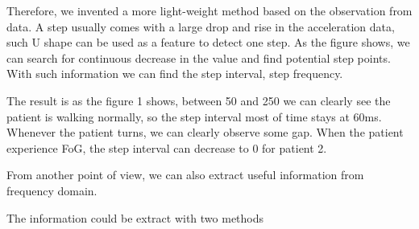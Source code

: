 \documentclass[article]{article}
\begin{document}
\begin{enumerate}
		Therefore, we invented a more light-weight method based on the observation from data. A step usually comes with a large drop and rise in the acceleration data, such U shape can be used as a feature to detect one step. As the figure shows, we can search for continuous decrease in the value and find potential step points. With such information we can find the step interval, step frequency.
		
		The result is as the figure 1 shows, between 50 and 250 we can clearly see the patient is walking normally, so the step interval most of time stays at 60ms. Whenever the patient turns, we can clearly observe some gap. When the patient experience FoG, the step interval can decrease to 0 for patient 2.	

	\end{enumerate}


	


	From another point of view, we can also extract useful information from frequency domain.
	
	 
	 The information could be extract with two methods
	 
\end{document}
